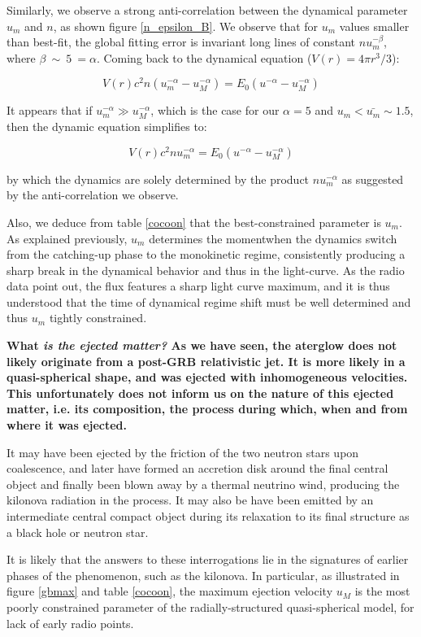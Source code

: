 Similarly, we observe a strong anti-correlation between the dynamical parameter $u_m$ and $n$, as shown figure \ref{n_epsilon_B}. We observe that for $u_m$ values smaller than best-fit, the global fitting error is invariant long lines of constant $nu_m^{-\beta}$, where $\beta~\sim~5~=\alpha$. Coming back to the dynamical equation ($V(r) = 4\pi r^3/3$):

$$V(r)c^2 n (u_m^{-\alpha} - u_M^{-\alpha}) = E_0 (u^{-\alpha} - u_M^{-\alpha}) $$

It appears that if $u_m^{-\alpha} \gg u_M^{-\alpha}$, which is the case for our $\alpha = 5$ and $u_m < \bar{u_m} \sim 1.5$, then the dynamic equation simplifies to:

$$V(r)c^2 n u_m^{-\alpha} = E_0 (u^{-\alpha} - u_M^{-\alpha}) $$

by which the dynamics are solely determined by the product $n u_m^{-\alpha}$ as suggested by the anti-correlation we observe.

Also, we deduce from table \ref{cocoon} that the best-constrained parameter is $u_m$. As explained previously, $u_m$ determines the momentwhen the dynamics switch from the catching-up phase to the monokinetic regime, consistently producing a sharp break in the dynamical behavior and thus in the light-curve. As the radio data point out, the flux features a sharp light curve maximum, and it is thus understood that the time of dynamical regime shift must be well determined and thus $u_m$ tightly constrained. 

\bf{What \it{is} the ejected matter? }As we have seen, the aterglow does not likely originate from a post-GRB relativistic jet. It is more likely in a quasi-spherical shape, and was ejected with inhomogeneous velocities. This unfortunately does not inform us on the nature of this ejected matter, i.e. its composition, the process during which, when and from where it was ejected.

It may have been ejected by the friction of the two neutron stars upon coalescence, and later have formed an accretion disk around the final central object and finally been blown away by a thermal neutrino wind, producing the kilonova radiation in the process. It may also be have been emitted by an intermediate central compact object during its relaxation to its final structure as a black hole or neutron star. 

It is likely that the answers to these interrogations lie in the signatures of earlier phases of the phenomenon, such as the kilonova. In particular, as illustrated in figure \ref{gbmax} and table \ref{cocoon}, the maximum ejection velocity $u_M$ is the most poorly constrained parameter of the radially-structured quasi-spherical model, for lack of early radio points. 

